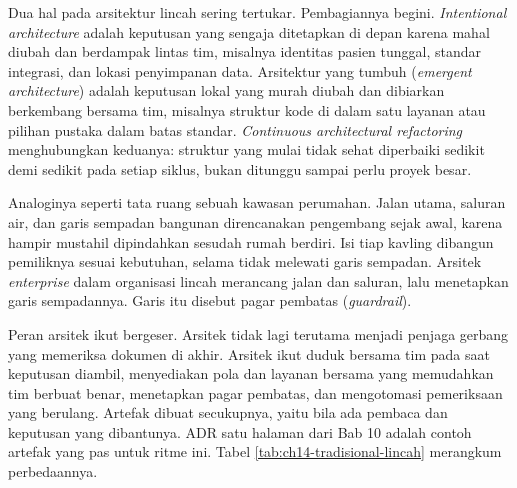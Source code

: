 Dua hal pada arsitektur lincah sering tertukar. Pembagiannya begini.
\textit{Intentional architecture} adalah keputusan yang sengaja ditetapkan
di depan karena mahal diubah dan berdampak lintas tim, misalnya identitas
pasien tunggal, standar integrasi, dan lokasi penyimpanan data. Arsitektur
yang tumbuh (\textit{emergent architecture}) adalah keputusan lokal yang
murah diubah dan dibiarkan berkembang bersama tim, misalnya struktur kode
di dalam satu layanan atau pilihan pustaka dalam batas standar.
\textit{Continuous architectural refactoring} menghubungkan keduanya:
struktur yang mulai tidak sehat diperbaiki sedikit demi sedikit pada setiap
siklus, bukan ditunggu sampai perlu proyek besar.

Analoginya seperti tata ruang sebuah kawasan perumahan. Jalan utama,
saluran air, dan garis sempadan bangunan direncanakan pengembang sejak
awal, karena hampir mustahil dipindahkan sesudah rumah berdiri. Isi tiap
kavling dibangun pemiliknya sesuai kebutuhan, selama tidak melewati garis
sempadan. Arsitek \textit{enterprise} dalam organisasi lincah merancang
jalan dan saluran, lalu menetapkan garis sempadannya. Garis itu disebut
pagar pembatas (\textit{guardrail}).

Peran arsitek ikut bergeser. Arsitek tidak lagi terutama menjadi penjaga
gerbang yang memeriksa dokumen di akhir. Arsitek ikut duduk bersama tim pada
saat keputusan diambil, menyediakan pola dan layanan bersama yang
memudahkan tim berbuat benar, menetapkan pagar pembatas, dan mengotomasi
pemeriksaan yang berulang. Artefak dibuat secukupnya, yaitu bila ada
pembaca dan keputusan yang dibantunya. ADR satu halaman dari Bab 10 adalah
contoh artefak yang pas untuk ritme ini. Tabel \ref{tab:ch14-tradisional-lincah}
merangkum perbedaannya.

